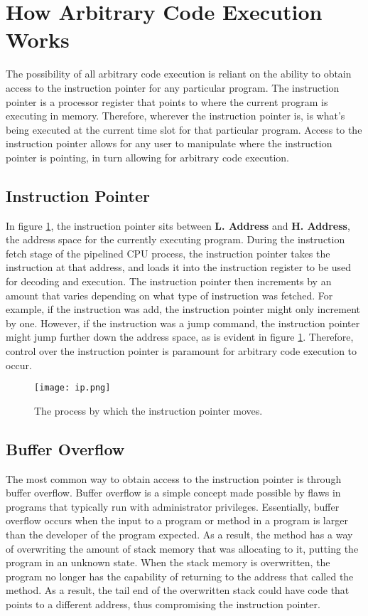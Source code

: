 \section{How Arbitrary Code Execution Works}

The possibility of all arbitrary code execution is reliant on the ability to obtain access to the instruction pointer for any particular program. The instruction pointer is a processor register that points to where the current program is executing in memory. Therefore, wherever the instruction pointer is, is what's being executed at the current time slot for that particular program. Access to the instruction pointer allows for any user to manipulate where the instruction pointer is pointing, in turn allowing for arbitrary code execution. 

\subsection{Instruction Pointer}

In figure \ref{fig:ip}, the instruction pointer sits between \textbf{L. Address} and \textbf{H. Address}, the address space for the currently executing program. During the instruction fetch stage of the pipelined CPU process, the instruction pointer takes the instruction at that address, and loads it into the instruction register to be used for decoding and execution. The instruction pointer then increments by an amount that varies depending on what type of instruction was fetched. For example, if the instruction was add, the instruction pointer might only increment by one. However, if the instruction was a jump command, the instruction pointer might jump further down the address space, as is evident in figure \ref{fig:ip}. Therefore, control over the instruction pointer is paramount for arbitrary code execution to occur. \cite{instruction_pointer_1999}

\begin{figure}
\texttt{[image: ip.png]}
\caption{The process by which the instruction pointer moves.}
\label{fig:ip}
\end{figure}

\subsection{Buffer Overflow}

The most common way to obtain access to the instruction pointer is through buffer overflow. Buffer overflow is a simple concept made possible by flaws in programs that typically run with administrator privileges. Essentially, buffer overflow occurs when the input to a program or method in a program is larger than the developer of the program expected. As a result, the method has a way of overwriting the amount of stack memory that was allocating to it, putting the program in an unknown state. When the stack memory is overwritten, the program no longer has the capability of returning to the address that called the method. As a result, the tail end of the overwritten stack could have code that points to a different address, thus compromising the instruction pointer.

